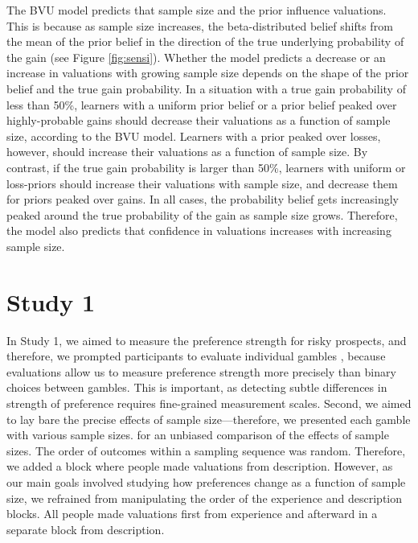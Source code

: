 \documentclass[a4paper, man, natbib, floatsintext]{apa6}
\begin{document}
The BVU model predicts that sample size and the prior influence valuations. This is because as sample size increases, the beta-distributed belief shifts from the mean of the prior belief in the direction of the true underlying probability of the gain  (see Figure \ref{fig:sensi}). Whether the model predicts a decrease or an increase in valuations with growing sample size depends on the shape of the prior belief and the true gain probability. In a situation with a true gain probability of less than 50\%, learners with a uniform prior belief or a prior belief peaked over highly-probable gains should decrease their valuations as a function of sample size, according to the BVU model. Learners with a prior peaked over losses, however, should increase their valuations as a function of sample size. By contrast, if the true gain probability is larger than 50\%, learners with uniform or loss-priors  should increase their valuations with sample size, and decrease them for priors peaked over gains. In all cases, the probability belief gets increasingly peaked around the true probability of the gain as sample size grows. Therefore, the model also predicts that confidence in valuations increases with increasing sample size. %


\section{Study 1}
In Study 1, we aimed to measure the preference strength for risky prospects, and therefore, we prompted participants to evaluate individual gambles \citep[similer to e.g.,][]{Ashby2014, Golan2014, Pachur2012}, because evaluations allow us to measure preference strength more precisely than binary choices between gambles. This is important, as detecting subtle differences in strength of preference requires fine-grained measurement scales.  Second, we aimed to lay bare the precise effects of sample size---therefore, we presented each gamble with various sample sizes.  for an unbiased comparison of the effects of sample sizes. The order of outcomes within a sampling sequence was random.  Therefore, we added a block where people made valuations from description. However, as our main goals involved studying how preferences change as a function of sample size, we refrained from manipulating the order of the experience and description blocks. All people made valuations first from experience and afterward in a separate block from description. 
\end{document}
